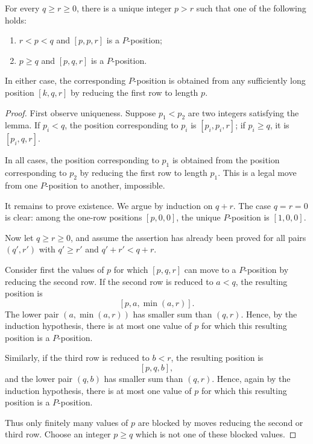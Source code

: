\documentclass[10pt,a4paper]{amsart}
\begin{document}
\begin{lemma}
\label{lem:encodedexistence}
For every $q\ge r\ge 0$, there is a unique integer $p>r$ such that one of the
following holds:
\begin{enumerate}
\item[(i)] $r<p<q$ and $[p,p,r]$ is a $P$-position;
\item[(ii)] $p\ge q$ and $[p,q,r]$ is a $P$-position.
\end{enumerate}
In either case, the corresponding $P$-position is obtained from any sufficiently
long position $[k,q,r]$ by reducing the first row to length $p$.
\end{lemma}

\begin{proof}
First observe uniqueness. Suppose $p_1<p_2$ are two integers satisfying the
lemma. If $p_i<q$, the position corresponding to $p_i$ is $[p_i,p_i,r]$; if
$p_i\ge q$, it is $[p_i,q,r]$.

In all cases, the position corresponding to $p_1$ is obtained from the
position corresponding to $p_2$ by reducing the first row to length $p_1$.
This is a legal move from one $P$-position to another, impossible.

It remains to prove existence. We argue by induction on $q+r$. The case
$q=r=0$ is clear: among the one-row positions $[p,0,0]$, the unique
$P$-position is $[1,0,0]$.

Now let $q\ge r\ge 0$, and assume the assertion has already been proved for
all pairs $(q',r')$ with $q'\ge r'$ and $q'+r'<q+r$.

Consider first the values of $p$ for which $[p,q,r]$ can move to a
$P$-position by reducing the second row. If the second row is reduced to
$a<q$, the resulting position is
\[
        [p,a,\min(a,r)].
\]
The lower pair $(a,\min(a,r))$ has smaller sum than $(q,r)$. Hence, by the
induction hypothesis, there is at most one value of $p$ for which this
resulting position is a $P$-position.

Similarly, if the third row is reduced to $b<r$, the resulting position is
\[
        [p,q,b],
\]
and the lower pair $(q,b)$ has smaller sum than $(q,r)$. Hence, again by the
induction hypothesis, there is at most one value of $p$ for which this
resulting position is a $P$-position.

Thus only finitely many values of $p$ are blocked by moves reducing the
second or third row. Choose an integer $p\ge q$ which is not one of these
blocked values.


\end{proof}
\end{document}
